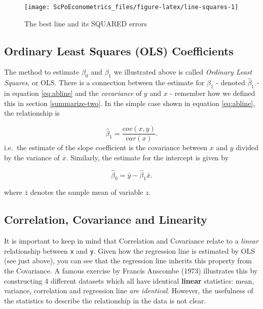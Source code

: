 \documentclass[]{book}
\theoremstyle{definition}
\theoremstyle{definition}
\theoremstyle{definition}
\theoremstyle{remark}
\begin{document}
\begin{figure}

{\centering \texttt{[image: ScPoEconometrics\_files/figure-latex/line-squares-1]} 

}

\caption{The best line and its SQUARED errors}\label{fig:line-squares}
\end{figure}

\subsection{Ordinary Least Squares (OLS)
Coefficients}\label{ordinary-least-squares-ols-coefficients}

The method to estimate \(\beta_0\) and \(\beta_1\) we illustrated above
is called \emph{Ordinary Least Squares}, or OLS. There is a connection
between the estimate for \(\beta_1\) - denoted \(\hat{\beta}_1\) - in
equation \eqref{eq:abline} and the \emph{covariance} of \(y\) and \(x\) -
remember how we defined this in section \ref{summarize-two}. In the
simple case shown in equation \eqref{eq:abline}, the relationship is

\[
\hat{\beta}_1 = \frac{cov(x,y)}{var(x)}.  \label{eq:beta1hat}
\] i.e.~the estimate of the slope coefficient is the covariance between
\(x\) and \(y\) divided by the variance of \(x\). Similarly, the
estimate for the intercept is given by

\[
\hat{\beta}_0 = \bar{y} - \hat{\beta}_1 \bar{x}.  \label{eq:beta0hat}
\]

where \(\bar{z}\) denotes the sample mean of variable \(z\).

\subsection{Correlation, Covariance and
Linearity}\label{correlation-covariance-and-linearity}

It is important to keep in mind that Correlation and Covariance relate
to a \emph{linear} relationship between \texttt{x} and \texttt{y}. Given
how the regression line is estimated by OLS (see just above), you can
see that the regression line inherits this property from the Covariance.
A famous exercise by Francis Anscombe (1973) illustrates this by
constructing 4 different datasets which all have identical
\textbf{linear} statistics: mean, variance, correlation and regression
line \emph{are identical}. However, the usefulness of the statistics to
describe the relationship in the data is not clear.
\end{document}
